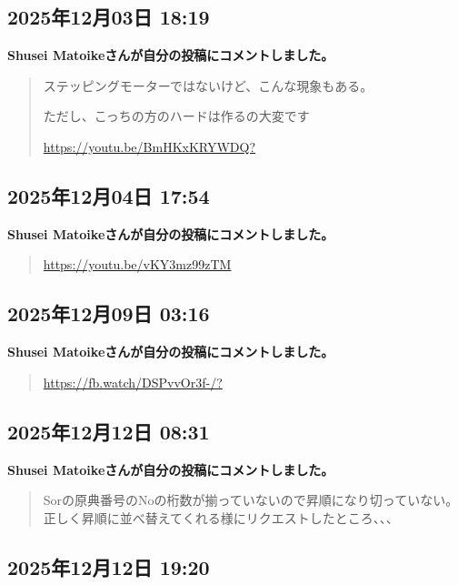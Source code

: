 \subsection*{2025年12月03日 18:19}

\textbf{Shusei Matoikeさんが自分の投稿にコメントしました。}

\begin{quote}
ステッピングモーターではないけど、こんな現象もある。

ただし、こっちの方のハードは作るの大変です

\url{https://youtu.be/BmHKxKRYWDQ?}
\end{quote}

\subsection*{2025年12月04日 17:54}

\textbf{Shusei Matoikeさんが自分の投稿にコメントしました。}

\begin{quote}
\url{https://youtu.be/vKY3mz99zTM}
\end{quote}

\subsection*{2025年12月09日 03:16}

\textbf{Shusei Matoikeさんが自分の投稿にコメントしました。}

\begin{quote}
\url{https://fb.watch/DSPvvOr3f-/?}
\end{quote}

\subsection*{2025年12月12日 08:31}

\textbf{Shusei Matoikeさんが自分の投稿にコメントしました。}

\begin{quote}
Sorの原典番号のNoの桁数が揃っていないので昇順になり切っていない。正しく昇順に並べ替えてくれる様にリクエストしたところ、、、
\end{quote}

\subsection*{2025年12月12日 19:20}

